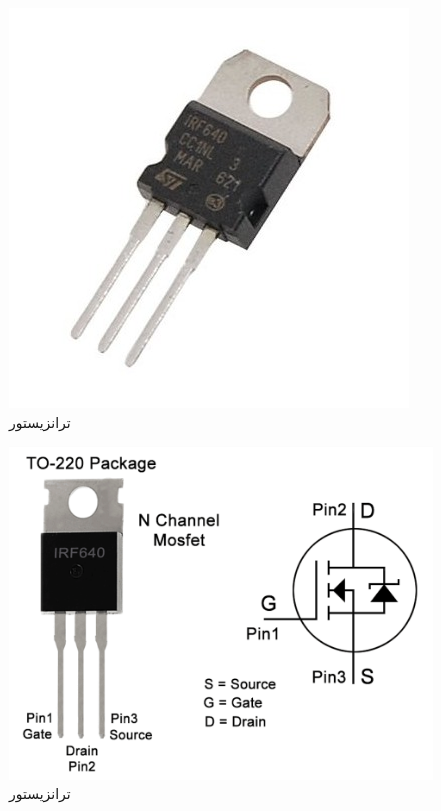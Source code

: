 \documentclass[12pt,a4paper]{article}
\begin{document}
\begin{enumerate}
		\begin{figure}[H]
			\centering
			\includegraphics[scale=0.2]{figs/irf640.jpeg}
			\caption{
				ترانزیستور 
			}
			\label{fig:schema}
		\end{figure}
		
		\begin{figure}[H]
			\centering
			\includegraphics[scale=0.3]{figs/irf-pinout.png}
			\caption{
				ترانزیستور 
			}
			\label{fig:schema}
		\end{figure}
			
	\end{enumerate}
	
\end{document}
